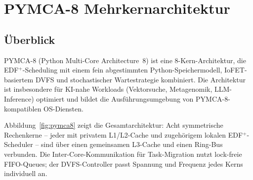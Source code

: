 ﻿\documentclass[a4paper,12pt]{scrreprt}
\theoremstyle{definition}
\begin{document}
	\chapter{PYMCA-8 Mehrkernarchitektur}
	
	\section{Überblick}

	PYMCA-8 (Python Multi-Core Architecture~8) \cite{Epp2026pymca8} ist eine
	8-Kern-Architektur, die EDF$^+$-Scheduling mit einem fein abgestimmten
	Python-Speichermodell, IoFET-basiertem DVFS und stochastischer
	Wartestrategie kombiniert. Die Architektur ist insbesondere für
	KI-nahe Workloads (Vektorsuche, Metagenomik, LLM-Inference) optimiert
	und bildet die Ausführungsumgebung von PYMCA-8-kompatiblen OS-Diensten.

	Abbildung~\ref{fig:pymca8} zeigt die Gesamtarchitektur: Acht symmetrische
	Rechenkerne -- jeder mit privatem L1/L2-Cache und zugehörigem lokalen
	EDF$^+$-Scheduler -- sind über einen gemeinsamen L3-Cache und einen
	Ring-Bus verbunden. Die Inter-Core-Kommunikation für Task-Migration nutzt
	lock-freie FIFO-Queues; der DVFS-Controller passt Spannung und Frequenz
	jedes Kerns individuell an.
\end{document}
